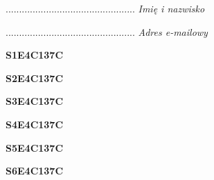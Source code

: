 \begin{turn}{90}\begin{minipage}{\linewidth} \vspace{20mm} ................................................  \textit{Imię i nazwisko}\end{minipage}\end{turn}

\begin{turn}{90}\begin{minipage}{\linewidth} \vspace{20mm} ................................................  \textit{Adres e-mailowy}\end{minipage}\end{turn}

\begin{turn}{90}\huge \begin{minipage}{\linewidth} \vspace{10mm}\textbf{S1E4C137C}\end{minipage}\end{turn}

\begin{turn}{90}\huge \begin{minipage}{\linewidth} \vspace{10mm}\textbf{S2E4C137C}\end{minipage}\end{turn}

\begin{turn}{90}\huge \begin{minipage}{\linewidth} \vspace{10mm}\textbf{S3E4C137C}\end{minipage}\end{turn}

\begin{turn}{90}\huge \begin{minipage}{\linewidth} \vspace{10mm}\textbf{S4E4C137C}\end{minipage}\end{turn}

\begin{turn}{90}\huge \begin{minipage}{\linewidth} \vspace{10mm}\textbf{S5E4C137C}\end{minipage}\end{turn}

\begin{turn}{90}\huge \begin{minipage}{\linewidth} \vspace{10mm}\textbf{S6E4C137C}\end{minipage}\end{turn}

